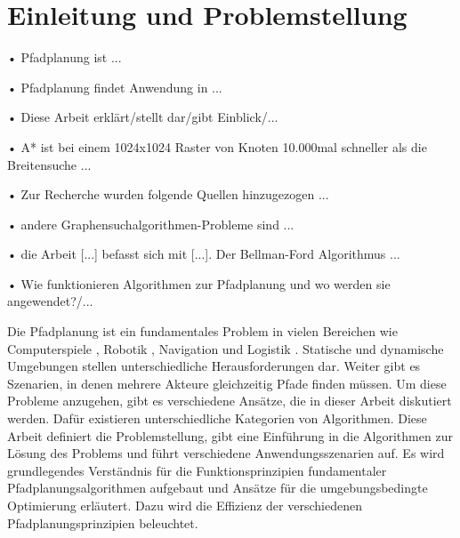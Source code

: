 \chapter{Einleitung und Problemstellung}

• Pfadplanung ist ...

• Pfadplanung findet Anwendung in ...

• Diese Arbeit erklärt/stellt dar/gibt Einblick/...

• A* ist bei einem 1024x1024 Raster von Knoten 10.000mal schneller als die Breitensuche ...

• Zur Recherche wurden folgende Quellen hinzugezogen ...

• andere Graphensuchalgorithmen-Probleme sind ...

• die Arbeit [...] befasst sich mit [...]. Der Bellman-Ford Algorithmus ...

• Wie funktionieren Algorithmen zur Pfadplanung und wo werden sie angewendet?/...




Die Pfadplanung ist ein fundamentales Problem in vielen Bereichen %
wie Computerspiele \cite{Kri09}, Robotik \cite{LB91}, Navigation und Logistik \cite{Botea.2011}. Statische und dynamische Umgebungen stellen unterschiedliche Herausforderungen dar. Weiter gibt es Szenarien, in denen mehrere Akteure gleichzeitig Pfade finden müssen. Um diese Probleme anzugehen, gibt es verschiedene Ansätze, die in dieser Arbeit diskutiert werden. Dafür existieren unterschiedliche Kategorien von Algorithmen. Diese Arbeit definiert die Problemstellung, gibt eine Einführung in die Algorithmen zur Lösung des Problems und führt verschiedene Anwendungsszenarien auf. Es wird grundlegendes Verständnis für die Funktionsprinzipien fundamentaler Pfadplanungsalgorithmen aufgebaut und Ansätze für die umgebungsbedingte Optimierung erläutert. Dazu wird die Effizienz der verschiedenen Pfadplanungsprinzipien beleuchtet.


